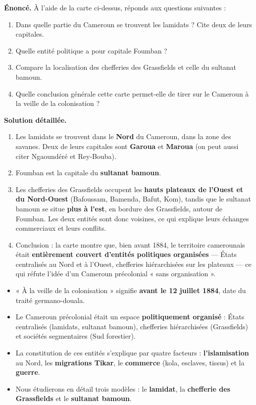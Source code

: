 \documentclass[11pt]{article}
\begin{document}
\begin{exoresolu}
\textbf{Énoncé.} À l'aide de la carte ci-dessus, réponds aux questions suivantes :
\begin{enumerate}
\item Dans quelle partie du Cameroun se trouvent les lamidats ? Cite deux de leurs capitales.
\item Quelle entité politique a pour capitale Foumban ?
\item Compare la localisation des chefferies des Grassfields et celle du sultanat bamoun.
\item Quelle conclusion générale cette carte permet-elle de tirer sur le Cameroun à la veille de la colonisation ?
\end{enumerate}
\tcblower
\textbf{Solution détaillée.}
\begin{enumerate}
\item Les lamidats se trouvent dans le \textbf{Nord} du Cameroun, dans la zone des savanes. Deux de leurs capitales sont \textbf{Garoua} et \textbf{Maroua} (on peut aussi citer Ngaoundéré et Rey-Bouba).
\item Foumban est la capitale du \textbf{sultanat bamoun}.
\item Les chefferies des Grassfields occupent les \textbf{hauts plateaux de l'Ouest et du Nord-Ouest} (Bafoussam, Bamenda, Bafut, Kom), tandis que le sultanat bamoun se situe \textbf{plus à l'est}, en bordure des Grassfields, autour de Foumban. Les deux entités sont donc voisines, ce qui explique leurs échanges commerciaux et leurs conflits.
\item Conclusion : la carte montre que, bien avant 1884, le territoire camerounais était \textbf{entièrement couvert d'entités politiques organisées} — États centralisés au Nord et à l'Ouest, chefferies hiérarchisées sur les plateaux — ce qui réfute l'idée d'un Cameroun précolonial « sans organisation ».
\end{enumerate}
\end{exoresolu}

\begin{aretenir}
\begin{itemize}
\item « À la veille de la colonisation » signifie \textbf{avant le 12 juillet 1884}, date du traité germano-douala.
\item Le Cameroun précolonial était un espace \textbf{politiquement organisé} : États centralisés (lamidats, sultanat bamoun), chefferies hiérarchisées (Grassfields) et sociétés segmentaires (Sud forestier).
\item La constitution de ces entités s'explique par quatre facteurs : \textbf{l'islamisation} au Nord, les \textbf{migrations Tikar}, le \textbf{commerce} (kola, esclaves, tissus) et la \textbf{guerre}.
\item Nous étudierons en détail trois modèles : le \textbf{lamidat}, la \textbf{chefferie des Grassfields} et le \textbf{sultanat bamoun}.
\end{itemize}
\end{aretenir}
\end{document}
